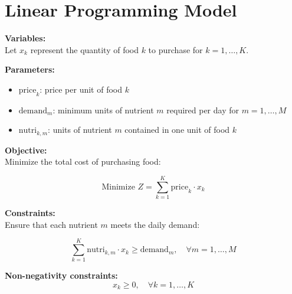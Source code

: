 \documentclass{article}
\begin{document}
\section*{Linear Programming Model}

\textbf{Variables:} \\
Let \( x_k \) represent the quantity of food \( k \) to purchase for \( k = 1, \ldots, K \).

\textbf{Parameters:} \\
\begin{itemize}
    \item \( \text{price}_k \): price per unit of food \( k \)
    \item \( \text{demand}_m \): minimum units of nutrient \( m \) required per day for \( m = 1, \ldots, M \)
    \item \( \text{nutri}_{k,m} \): units of nutrient \( m \) contained in one unit of food \( k \)
\end{itemize}

\textbf{Objective:} \\
Minimize the total cost of purchasing food:

\[
\text{Minimize } Z = \sum_{k=1}^{K} \text{price}_k \cdot x_k
\]

\textbf{Constraints:} \\
Ensure that each nutrient \( m \) meets the daily demand:

\[
\sum_{k=1}^{K} \text{nutri}_{k,m} \cdot x_k \geq \text{demand}_m, \quad \forall m = 1, \ldots, M
\]

\textbf{Non-negativity constraints:} \\
\[
x_k \geq 0, \quad \forall k = 1, \ldots, K
\]
\end{document}
